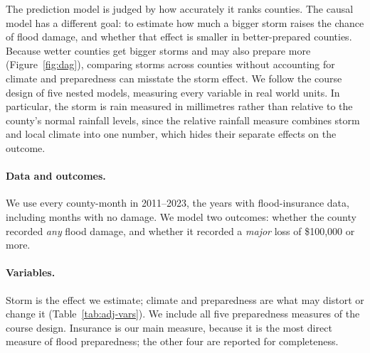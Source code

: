 \documentclass[10pt,twocolumn]{article}
\begin{document}
The prediction model is judged by how accurately it ranks counties. The causal model has a
different goal: to estimate how much a bigger storm raises the chance of flood damage, and whether
that effect is smaller in better-prepared counties. Because wetter counties get bigger storms and
may also prepare more (Figure~\ref{fig:dag}), comparing storms across counties without accounting
for climate and preparedness can misstate the storm effect. We follow the course design of five
nested models, measuring every variable in real world units. In particular, the storm is
rain measured in millimetres rather than relative to the county's normal rainfall levels, since the relative rainfall measure combines
storm and local climate into one number, which hides their separate effects on the outcome.

\paragraph{Data and outcomes.} We use every county-month in 2011--2023, the years with
flood-insurance data, including months with no damage. We model two outcomes: whether the county
recorded \emph{any} flood damage, and whether it recorded a \emph{major} loss of \$100{,}000 or
more.

\paragraph{Variables.} Storm is the effect we estimate; climate and preparedness are what may
distort or change it (Table~\ref{tab:adj-vars}). We include all five preparedness measures of the
course design. Insurance is our main measure, because it is the most direct measure of flood
preparedness; the other four are reported for completeness.
\end{document}
